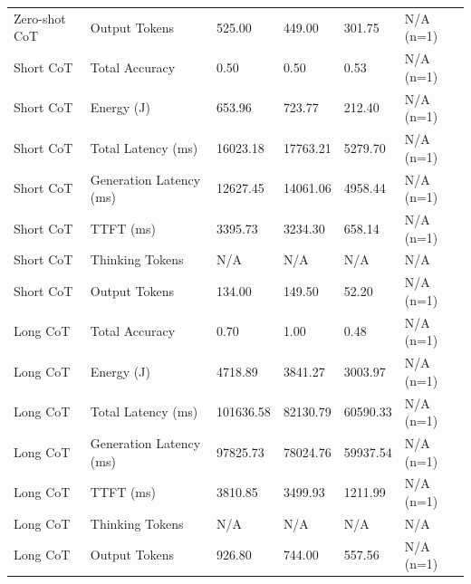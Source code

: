 \begin{table}
\begin{tabular}{llllll}
Zero-shot CoT & Output Tokens & 525.00 & 449.00 & 301.75 & N/A (n=1) \\
Short CoT & Total Accuracy & 0.50 & 0.50 & 0.53 & N/A (n=1) \\
Short CoT & Energy (J) & 653.96 & 723.77 & 212.40 & N/A (n=1) \\
Short CoT & Total Latency (ms) & 16023.18 & 17763.21 & 5279.70 & N/A (n=1) \\
Short CoT & Generation Latency (ms) & 12627.45 & 14061.06 & 4958.44 & N/A (n=1) \\
Short CoT & TTFT (ms) & 3395.73 & 3234.30 & 658.14 & N/A (n=1) \\
Short CoT & Thinking Tokens & N/A & N/A & N/A & N/A \\
Short CoT & Output Tokens & 134.00 & 149.50 & 52.20 & N/A (n=1) \\
Long CoT & Total Accuracy & 0.70 & 1.00 & 0.48 & N/A (n=1) \\
Long CoT & Energy (J) & 4718.89 & 3841.27 & 3003.97 & N/A (n=1) \\
Long CoT & Total Latency (ms) & 101636.58 & 82130.79 & 60590.33 & N/A (n=1) \\
Long CoT & Generation Latency (ms) & 97825.73 & 78024.76 & 59937.54 & N/A (n=1) \\
Long CoT & TTFT (ms) & 3810.85 & 3499.93 & 1211.99 & N/A (n=1) \\
Long CoT & Thinking Tokens & N/A & N/A & N/A & N/A \\
Long CoT & Output Tokens & 926.80 & 744.00 & 557.56 & N/A (n=1) \\
\bottomrule
\end{tabular}
\end{table}
